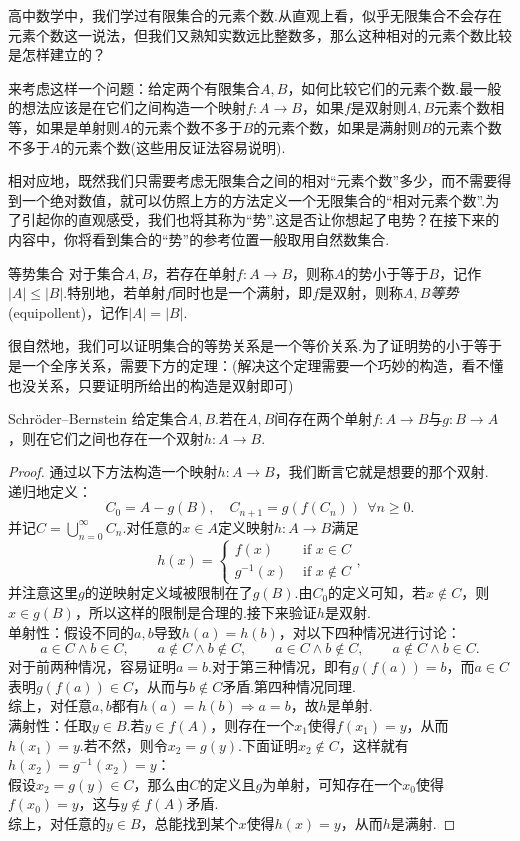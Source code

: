 高中数学中，我们学过有限集合的元素个数.从直观上看，似乎无限集合不会存在元素个数这一说法，但我们又熟知实数远比整数多，那么这种相对的元素个数比较是怎样建立的？

来考虑这样一个问题：给定两个有限集合$A,B$，如何比较它们的元素个数.最一般的想法应该是在它们之间构造一个映射$f:A \to B$，如果$f$是双射则$A,B$元素个数相等，如果是单射则$A$的元素个数不多于$B$的元素个数，如果是满射则$B$的元素个数不多于$A$的元素个数(这些用反证法容易说明).

相对应地，既然我们只需要考虑无限集合之间的相对“元素个数”多少，而不需要得到一个绝对数值，就可以仿照上方的方法定义一个无限集合的“相对元素个数”.为了引起你的直观感受，我们也将其称为“势”.这是否让你想起了电势？在接下来的内容中，你将看到集合的“势”的参考位置一般取用自然数集合.

\begin{definition}{等势集合}
	对于集合$A,B$，若存在单射$f:A \to B$，则称$A$的势小于等于$B$，记作$|A| \leq |B|$.特别地，若单射$f$同时也是一个满射，即$f$是双射，则称$A,B$\textit{等势}(equipollent)，记作$|A|=|B|$.
\end{definition}

很自然地，我们可以证明集合的等势关系是一个等价关系.为了证明势的小于等于是一个全序关系，需要下方的定理：(解决这个定理需要一个巧妙的构造，看不懂也没关系，只要证明所给出的构造是双射即可)

\begin{theorem}{Schröder–Bernstein}
	给定集合$A,B$.若在$A,B$间存在两个单射$f:A \to B$与$g:B \to A$，则在它们之间也存在一个双射$h:A \to B$.
\end{theorem}
\begin{proof}
	通过以下方法构造一个映射$h:A \to B$，我们断言它就是想要的那个双射. \\
	递归地定义：$$C_0 = A - g(B),\quad C_{n+1}=g(f(C_n))~~\forall n \geq 0.$$
	并记$C = \bigcup_{n=0}^{\infty} C_n$.对任意的$x \in A$定义映射$h: A\to B$满足$$h(x) = \begin{cases}
 f(x) & \text{ if } x \in C \\
 g^{-1}(x) & \text{ if } x \notin C
\end{cases},$$并注意这里$g$的逆映射定义域被限制在了$g(B)$.由$C_0$的定义可知，若$x \notin C$，则$x \in g(B)$，所以这样的限制是合理的.接下来验证$h$是双射. \\
单射性：假设不同的$a,b$导致$h(a)=h(b)$，对以下四种情况进行讨论：$$a \in C \wedge b \in C,\qquad a \notin C \wedge b \notin C,\qquad a \in C \wedge b \notin C,\qquad a \notin C \wedge b \in C.$$
对于前两种情况，容易证明$a=b$.对于第三种情况，即有$g(f(a))=b$，而$a \in C$表明$g(f(a)) \in C$，从而与$b \notin C$矛盾.第四种情况同理. \\
综上，对任意$a,b$都有$h(a)=h(b) \Rightarrow a=b$，故$h$是单射. \\
满射性：任取$y \in B$.若$y \in f(A)$，则存在一个$x_1$使得$f(x_1)=y$，从而$h(x_1)=y$.若不然，则令$x_2=g(y)$.下面证明$x_2 \notin C$，这样就有$h(x_2)=g^{-1}(x_2)=y$： \\
假设$x_2=g(y) \in C$，那么由$C$的定义且$g$为单射，可知存在一个$x_0$使得$f(x_0)=y$，这与$y \notin f(A)$矛盾. \\
综上，对任意的$y \in B$，总能找到某个$x$使得$h(x)=y$，从而$h$是满射.
\end{proof}

